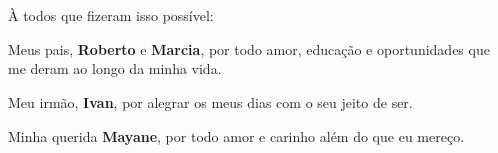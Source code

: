
\chapter*{}
\vspace{15cm}
\begin{flushright}
	À todos que fizeram isso possível:

	Meus pais, \textbf{Roberto} e \textbf{Marcia}, por todo amor, educação e oportunidades que me deram ao longo da minha vida.

	Meu irmão, \textbf{Ivan}, por alegrar os meus dias com o seu jeito de ser.

	Minha querida \textbf{Mayane}, por todo amor e carinho além do que eu mereço.

\end{flushright}
